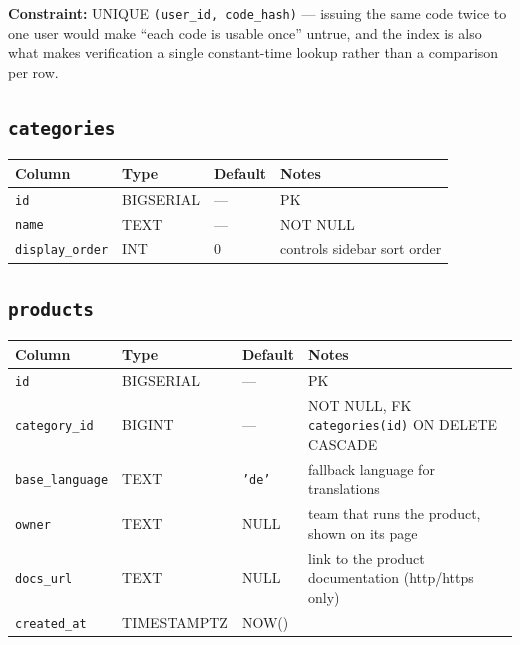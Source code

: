 \documentclass[12pt,a4paper,twoside]{report}
\newcommand{\code}[1]{\texttt{#1}}
\begin{document}
\noindent\textbf{Constraint:} UNIQUE \code{(user\_id, code\_hash)} — issuing the
same code twice to one user would make ``each code is usable once'' untrue, and
the index is also what makes verification a single constant-time lookup rather
than a comparison per row.

\subsection*{\texttt{categories}}

\begin{table}[H]
  \centering\small
  \begin{tabular}{@{}llll@{}}
    \toprule
    \textbf{Column} & \textbf{Type} & \textbf{Default} & \textbf{Notes} \\
    \midrule
    \code{id}            & BIGSERIAL & --- & PK \\
    \code{name}          & TEXT      & --- & NOT NULL \\
    \code{display\_order}& INT       & 0   & controls sidebar sort order \\
    \bottomrule
  \end{tabular}
\end{table}

\subsection*{\texttt{products}}

\begin{table}[H]
  \centering\small
  \begin{tabular}{@{}llll@{}}
    \toprule
    \textbf{Column} & \textbf{Type} & \textbf{Default} & \textbf{Notes} \\
    \midrule
    \code{id}           & BIGSERIAL & ---  & PK \\
    \code{category\_id} & BIGINT    & ---  & NOT NULL, FK \textrightarrow{} \code{categories(id)} ON DELETE CASCADE \\
    \code{base\_language}& TEXT     & \code{'de'} & fallback language for translations \\
    \code{owner}        & TEXT      & NULL & team that runs the product, shown on its page \\
    \code{docs\_url}    & TEXT      & NULL & link to the product documentation (http/https only) \\
    \code{created\_at}  & TIMESTAMPTZ & NOW() & \\
    \bottomrule
  \end{tabular}
\end{table}
\end{document}
